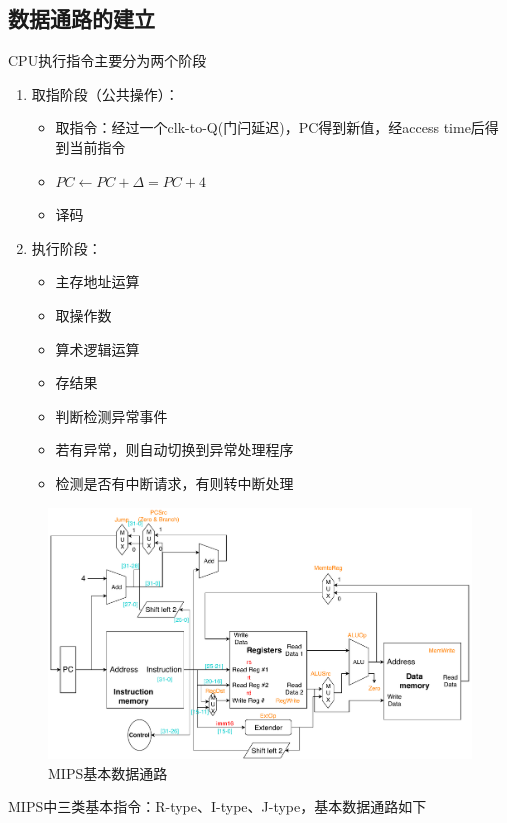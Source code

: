 \subsection{数据通路的建立}
CPU执行指令主要分为两个阶段
\begin{enumerate}
	\item 取指阶段（公共操作）：
	\begin{itemize}
		\item 取指令：经过一个clk-to-Q(门闩延迟)，PC得到新值，经access time后得到当前指令
		\item $PC\gets PC+\Delta=PC+4$
		\item 译码
	\end{itemize}
	\item 执行阶段：
	\begin{itemize}
		\item 主存地址运算
		\item 取操作数
		\item 算术逻辑运算
		\item 存结果
		\item 判断检测异常事件
		\item 若有异常，则自动切换到异常处理程序
		\item 检测是否有中断请求，有则转中断处理
	\end{itemize}
\end{enumerate}
\begin{figure}[htbp]
\centering
\includegraphics[width=\linewidth]{fig/Datapath_All.pdf}
\caption{MIPS基本数据通路}
\end{figure}
\par MIPS中三类基本指令：R-type、I-type、J-type，基本数据通路如下
